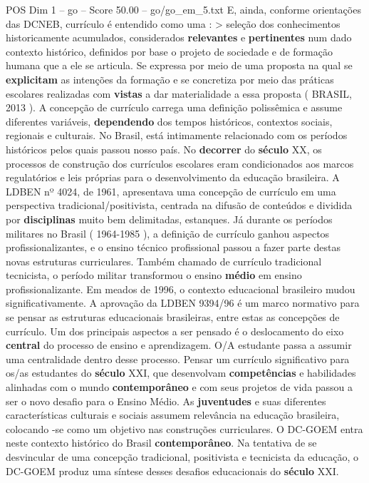 \begin{textsample}{POS Dim 1 – go – Score 50.00 – go/go\_em\_5.txt}
E, ainda, conforme orientações das DCNEB, currículo é entendido como uma : > seleção dos conhecimentos historicamente acumulados, considerados \textbf{relevantes} e \textbf{pertinentes} num dado contexto histórico, definidos por base o projeto de sociedade e de formação humana que a ele se articula.
Se expressa por meio de uma proposta na qual se \textbf{explicitam} as intenções da formação e se concretiza por meio das práticas escolares realizadas com \textbf{vistas} a dar materialidade a essa proposta ( BRASIL, 2013 ).
A concepção de currículo carrega uma definição polissêmica e assume diferentes variáveis, \textbf{dependendo} dos tempos históricos, contextos sociais, regionais e culturais.
No Brasil, está intimamente relacionado com os períodos históricos pelos quais passou nosso país.
No \textbf{decorrer} do \textbf{século} XX, os processos de construção dos currículos escolares eram condicionados aos marcos regulatórios e leis próprias para o desenvolvimento da educação brasileira.
A LDBEN nº 4024, de 1961, apresentava uma concepção de currículo em uma perspectiva tradicional/positivista, centrada na difusão de conteúdos e dividida por \textbf{disciplinas} muito bem delimitadas, estanques.
Já durante os períodos militares no Brasil ( 1964-1985 ), a definição de currículo ganhou aspectos profissionalizantes, e o ensino técnico profissional passou a fazer parte destas novas estruturas curriculares.
Também chamado de currículo tradicional tecnicista, o período militar transformou o ensino \textbf{médio} em ensino profissionalizante.
Em meados de 1996, o contexto educacional brasileiro mudou significativamente.
A aprovação da LDBEN 9394/96 é um marco normativo para se pensar as estruturas educacionais brasileiras, entre estas as concepções de currículo.
Um dos principais aspectos a ser pensado é o deslocamento do eixo \textbf{central} do processo de ensino e aprendizagem.
O/A estudante passa a assumir uma centralidade dentro desse processo.
Pensar um currículo significativo para os/as estudantes do \textbf{século} XXI, que desenvolvam \textbf{competências} e habilidades alinhadas com o mundo \textbf{contemporâneo} e com seus projetos de vida passou a ser o novo desafio para o Ensino Médio.
As \textbf{juventudes} e suas diferentes características culturais e sociais assumem relevância na educação brasileira, colocando -se como um objetivo nas construções curriculares.
O DC-GOEM entra neste contexto histórico do Brasil \textbf{contemporâneo}.
Na tentativa de se desvincular de uma concepção tradicional, positivista e tecnicista da educação, o DC-GOEM produz uma síntese desses desafios educacionais do \textbf{século} XXI.

\end{textsample}
